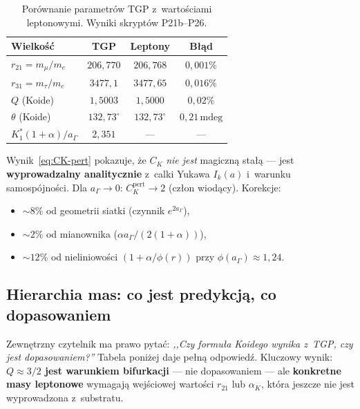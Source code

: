 \begin{table}[h]
\centering
\small
\caption{Porównanie parametrów TGP z~warto\'sciami leptonowymi.
         Wyniki skrypt\'ow P21b--P26.}
\label{tab:tgp-lepton-comparison}
\begin{tabular}{@{}lccc@{}}
\toprule
\textbf{Wielko\'s\'c} & \textbf{TGP} & \textbf{Leptony} & \textbf{B\l\k{a}d} \\
\midrule
$r_{21} = m_\mu/m_e$ & $206{,}770$ & $206{,}768$ & $0{,}001\%$ \\
$r_{31} = m_\tau/m_e$ & $3477{,}1$ & $3477{,}65$ & $0{,}016\%$ \\
$Q$ (Koide) & $1{,}5003$ & $1{,}5000$ & $0{,}02\%$ \\
$\theta$ (Koide) & $132{,}73^\circ$ & $132{,}73^\circ$ & $0{,}21\,\mathrm{mdeg}$ \\
$K^*_1 (1+\alpha)/a_\Gamma$ & $2{,}351$ & --- & --- \\
\bottomrule
\end{tabular}
\end{table}

\begin{remark}[Zale\.zno\'s\'c analityczna $C_K = f(\alpha, a_\Gamma)$]
Wynik~\eqref{eq:CK-pert} pokazuje, \.ze $C_K$ \emph{nie jest}
magiczn\k{a} sta\l{}\k{a} — jest \textbf{wyprowadzalny analitycznie}
z~calki Yukawa $I_k(a)$ i~warunku samospójno\'sci.
Dla $a_\Gamma \to 0$: $C_K^{\mathrm{pert}} \to 2$ (cz\l{}on
wiod\k{a}cy). Korekcje:
\begin{itemize}[nosep]
    \item $\sim 8\%$ od geometrii siatki (czynnik $e^{2a_\Gamma}$),
    \item $\sim 2\%$ od mianownika ($\alpha a_\Gamma/(2(1+\alpha))$),
    \item $\sim 12\%$ od nieliniowo\'sci $(1+\alpha/\phi(r))$ przy $\phi(a_\Gamma) \approx 1{,}24$.
\end{itemize}
\end{remark}

\subsection{Hierarchia mas: co jest predykcj\k{a}, co dopasowaniem}\label{ssec:koide-hierarchy}

\begin{remark}\label{rem:koide-predict-vs-fit}
Zewn\k{e}trzny czytelnik ma prawo pyta\'c:
\emph{,,Czy formu\l{}a Koidego wynika z~TGP, czy jest dopasowaniem?''}
Tabela poni\.zej daje pe\l{}n\k{a} odpowied\'z.
Kluczowy wynik: \textbf{$Q \approx 3/2$ jest warunkiem bifurkacji}
--- nie dopasowaniem --- ale \textbf{konkretne masy leptonowe}
wymagaj\k{a} wej\'sciowej warto\'sci $r_{21}$ lub $\alpha_K$,
kt\'ora jeszcze nie jest wyprowadzona z~substratu.
\end{remark}

